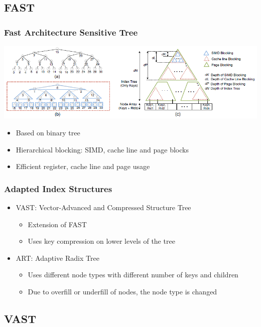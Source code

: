 \documentclass{beamer}
\begin{document}
\subsection{FAST}
\begin{frame}
\frametitle{Fast Architecture Sensitive Tree}
\begin{center}
	\includegraphics[width=1.05\textwidth]{img/fast.png}
\end{center}
\begin{itemize}
	\item Based on binary tree
	\item Hierarchical blocking: SIMD, cache line and page blocks
	\item Efficient register, cache line and page usage
\end{itemize}
\end{frame}
\begin{frame}
\frametitle{Adapted Index Structures}
\begin{itemize}
	\item VAST: Vector-Advanced and Compressed Structure Tree
	\begin{itemize}
		\item Extension of FAST
		\item Uses key compression on lower levels of the tree
	\end{itemize}
	\item ART: Adaptive Radix Tree
	\begin{itemize}
		\item Uses different node types with different number of keys and children
		\item Due to overfill or underfill of nodes, the node type is changed
	\end{itemize}
\end{itemize}
\end{frame}
\subsection{VAST}
\end{document}
